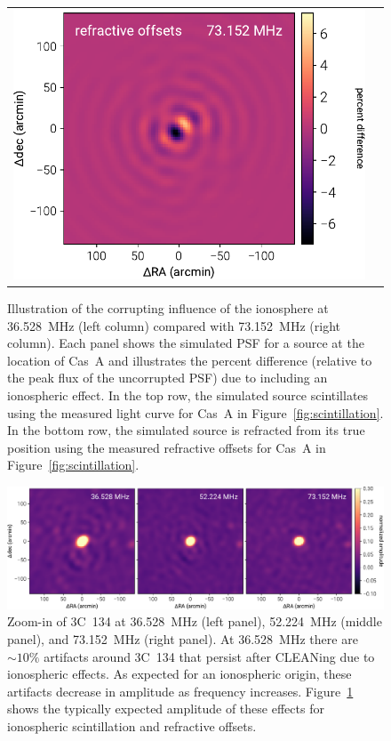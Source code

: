 \begin{bibunit}
\begin{figure}[t]
\begin{tabular}{cc}
        \includegraphics[width=\columnwidth]{figures/chapter3/refraction-18} \\
    \end{tabular}
    \caption{
        Illustration of the corrupting influence of the ionosphere at 36.528~MHz (left column)
        compared with 73.152~MHz (right column). Each panel shows the simulated PSF for a source at
        the location of Cas~A and illustrates the percent difference (relative to the peak flux of
        the uncorrupted PSF) due to including an ionospheric effect.  In the top row, the simulated
        source scintillates using the measured light curve for Cas~A in
        Figure~\ref{fig:scintillation}. In the bottom row, the simulated source is refracted from
        its true position using the measured refractive offsets for Cas~A in
        Figure~\ref{fig:scintillation}.
    }
    \label{fig:ionospheric-simulations}
\end{figure}

\begin{figure}[t]
    \centering
    \includegraphics[width=\textwidth]{figures/chapter3/3C134}
    \caption{
        Zoom-in of 3C~134 at 36.528~MHz (left panel), 52.224~MHz (middle panel), and 73.152~MHz
        (right panel). At 36.528~MHz there are $\sim10\%$ artifacts around 3C~134 that persist after
        CLEANing due to ionospheric effects. As expected for an ionospheric origin, these artifacts
        decrease in amplitude as frequency increases. Figure~\ref{fig:ionospheric-simulations} shows
        the typically expected amplitude of these effects for ionospheric scintillation and
        refractive offsets.
    }
    \label{fig:3C134}
\end{figure}


\end{bibunit}
